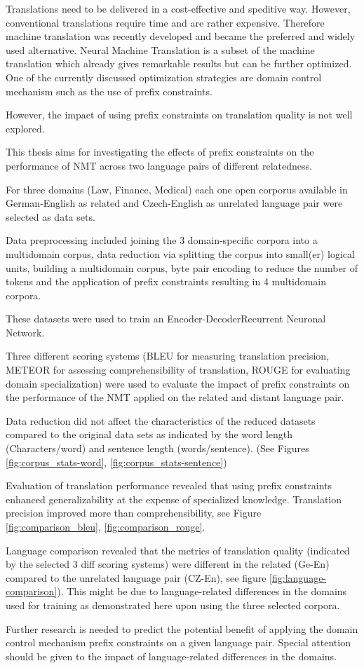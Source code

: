 Translations need to be delivered in a cost-effective and speditive way.
However, conventional translations require time and are rather expensive.
Therefore machine translation was recently developed and became the preferred and widely used alternative. 
Neural Machine Translation is a subset of the machine translation which already gives remarkable results but can be further optimized. One of the currently discussed optimization strategies are domain control mechanism such as the use of prefix constraints. 

However, the impact of using prefix constraints on translation quality is not well explored. 

This thesis aims for investigating the effects of prefix constraints on the performance of NMT across two language pairs of different relatedness. 

For three domains (Law, Finance, Medical) each one open corporus available in German-English as related and Czech-English as unrelated language pair were selected as data sets. 

Data preprocessing included joining the 3 domain-specific corpora into a multidomain corpus, data reduction via splitting the corpus into small(er) logical units, building a multidomain corpus, byte pair encoding to reduce the number of tokens and the application of prefix constraints resulting in 4 multidomain corpora. 

These datasets were used to train an Encoder-DecoderRecurrent Neuronal Network.

Three different scoring systems  (BLEU for measuring translation precision, METEOR for assessing comprehensibility of translation, ROUGE for evaluating domain specialization) were used to evaluate the impact of prefix constraints on the performance of the NMT applied on the related and distant language pair. 

Data reduction did not affect the characteristics of the reduced datasets compared to the original data sets as indicated by the word length (Characters/word) and sentence length (words/sentence). (See Figures \ref{fig:corpus_stats-word}, \ref{fig:corpus_stats-sentence})

Evaluation of translation performance revealed that using prefix constraints enhanced generalizability at the expense of specialized knowledge. Translation precision improved more than comprehensibility, see Figure \ref{fig:comparison_bleu}, \ref{fig:comparison_rouge}.

Language comparison revealed that the metrics of translation quality (indicated by the selected 3 diff scoring systems) were different in the related (Ge-En) compared to the unrelated language pair (CZ-En), see figure \ref{fig:language-comparison}).
This might be due to  language-related differences in the domains used for training as demonstrated here upon using the three selected corpora. 

Further research is needed to predict the potential benefit of applying the domain control mechanism prefix constraints on a given language pair.
Special attention should be given to the impact of language-related differences in the domains.
